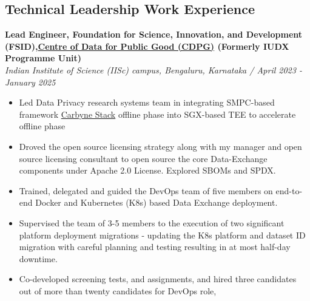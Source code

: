 \documentclass[a4paper,11pt]{article}
\begin{document}
\subsection*{Technical Leadership Work Experience} 
\textbf{Lead Engineer, Foundation for Science, Innovation, and Development (FSID),\href{https://dataforpublicgood.org.in/}{Centre of Data for Public Good (CDPG)} (Formerly IUDX Programme Unit)} \\
\textit{Indian Institute of Science (IISc) campus, Bengaluru, Karnataka / April 2023 - January 2025} 
\begin{itemize}
\item Led Data Privacy research systems team in integrating SMPC-based framework \href{https://carbynestack.io/}{Carbyne Stack} offline phase into SGX-based TEE to accelerate offline phase 
\item Droved the open source licensing strategy along with my manager and open source licensing consultant to open source the core Data-Exchange components under Apache 2.0 License. Explored SBOMs and SPDX.
\item Trained, delegated and guided the DevOps team of five members on end-to-end Docker and Kubernetes (K8s) based  Data Exchange deployment.

\item Supervised the team of 3-5 members to the execution of two significant platform deployment migrations - updating the K8s platform and dataset ID migration with careful planning and testing resulting in at most half-day downtime.
\item Co-developed screening tests, and assignments, and hired three candidates out of more than twenty candidates for DevOps role, 
\end{itemize}
\end{document}
